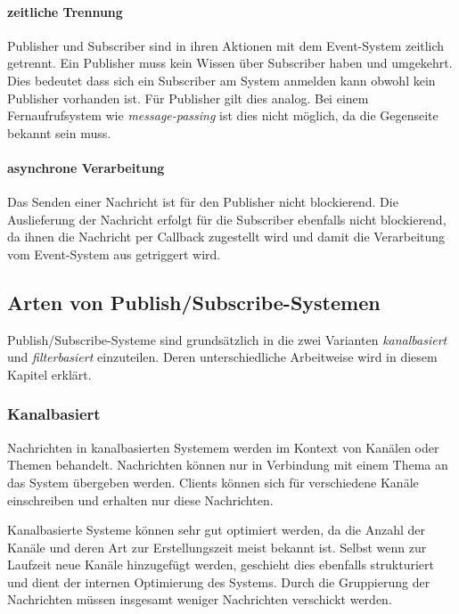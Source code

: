\paragraph{zeitliche Trennung}
Publisher und Subscriber sind in ihren Aktionen mit dem Event-System zeitlich getrennt. Ein Publisher muss kein Wissen über Subscriber haben und umgekehrt. Dies bedeutet dass sich ein Subscriber am System anmelden kann obwohl kein Publisher vorhanden ist. Für Publisher gilt dies analog. Bei einem Fernaufrufsystem wie \emph{message-passing} ist dies nicht möglich, da die Gegenseite bekannt sein muss.


\paragraph{asynchrone Verarbeitung}
Das Senden einer Nachricht ist für den Publisher nicht blockierend. Die Auslieferung der Nachricht erfolgt für die Subscriber ebenfalls nicht blockierend, da ihnen die Nachricht per Callback zugestellt wird und damit die Verarbeitung vom Event-System aus getriggert wird.


\subsection{Arten von Publish/Subscribe-Systemen}
Publish/Subscribe-Systeme sind grundsätzlich in die zwei Varianten  \emph{kanalbasiert} und \emph{filterbasiert} einzuteilen. Deren unterschiedliche Arbeitweise wird in diesem Kapitel erklärt.

\subsubsection{Kanalbasiert}
\label{chap:grundlagen:pubsub:kanalbasiert}
Nachrichten in kanalbasierten Systemem werden im Kontext von Kanälen oder Themen behandelt. Nachrichten können nur in Verbindung mit einem Thema an das System übergeben werden. Clients können sich für verschiedene Kanäle einschreiben und erhalten nur diese Nachrichten.

Kanalbasierte Systeme können sehr gut optimiert werden, da die Anzahl der Kanäle und deren Art zur Erstellungszeit meist bekannt ist. Selbst wenn zur Laufzeit neue Kanäle hinzugefügt werden, geschieht dies ebenfalls strukturiert und dient der internen Optimierung des Systems. Durch die Gruppierung der Nachrichten müssen insgesamt weniger Nachrichten verschickt werden.

